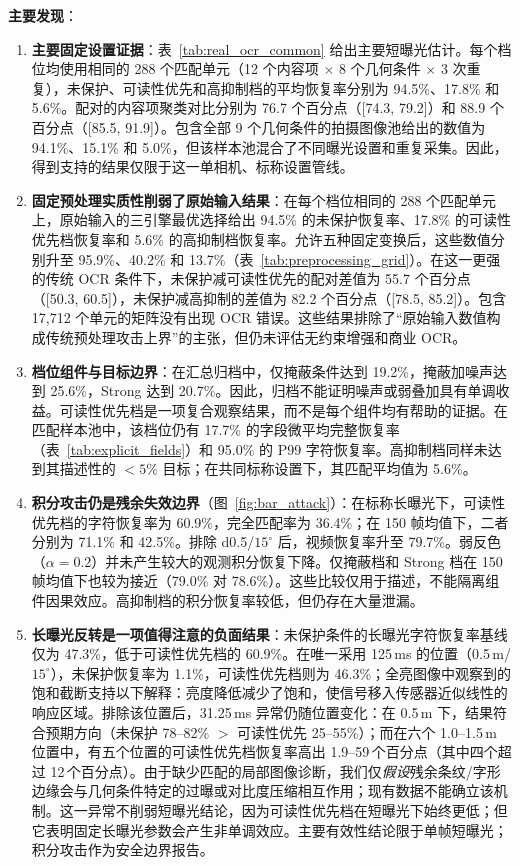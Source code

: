 \documentclass{ieeeaccess}
\begin{document}
\textbf{主要发现}：

\begin{enumerate}
\item \textbf{主要固定设置证据}：表~\ref{tab:real_ocr_common} 给出主要短曝光估计。每个档位均使用相同的 288 个匹配单元（12 个内容项 $\times$ 8 个几何条件 $\times$ 3 次重复），未保护、可读性优先和高抑制档的平均恢复率分别为 94.5\%、17.8\% 和 5.6\%。配对的内容项聚类对比分别为 76.7 个百分点（[74.3, 79.2]）和 88.9 个百分点（[85.5, 91.9]）。包含全部 9 个几何条件的拍摄图像池给出的数值为 94.1\%、15.1\% 和 5.0\%，但该样本池混合了不同曝光设置和重复采集。因此，得到支持的结果仅限于这一单相机、标称设置管线。

\item \textbf{固定预处理实质性削弱了原始输入结果}：在每个档位相同的 288 个匹配单元上，原始输入的三引擎最优选择给出 94.5\% 的未保护恢复率、17.8\% 的可读性优先档恢复率和 5.6\% 的高抑制档恢复率。允许五种固定变换后，这些数值分别升至 95.9\%、40.2\% 和 13.7\%（表~\ref{tab:preprocessing_grid}）。在这一更强的传统 OCR 条件下，未保护减可读性优先的配对差值为 55.7 个百分点（[50.3, 60.5]），未保护减高抑制的差值为 82.2 个百分点（[78.5, 85.2]）。包含 17,712 个单元的矩阵没有出现 OCR 错误。这些结果排除了“原始输入数值构成传统预处理攻击上界”的主张，但仍未评估无约束增强和商业 OCR。

\item \textbf{档位组件与目标边界}：在汇总归档中，仅掩蔽条件达到 19.2\%，掩蔽加噪声达到 25.6\%，Strong 达到 20.7\%。因此，归档不能证明噪声或弱叠加具有单调收益。可读性优先档是一项复合观察结果，而不是每个组件均有帮助的证据。在匹配样本池中，该档位仍有 17.7\% 的字段微平均完整恢复率（表~\ref{tab:explicit_fields}）和 95.0\% 的 P99 字符恢复率。高抑制档同样未达到其描述性的 $<5\%$ 目标；在共同标称设置下，其匹配平均值为 5.6\%。

\item \textbf{积分攻击仍是残余失效边界}（图~\ref{fig:bar_attack}）：在标称长曝光下，可读性优先档的字符恢复率为 60.9\%，完全匹配率为 36.4\%；在 150 帧均值下，二者分别为 71.1\% 和 42.5\%。排除 d0.5/$15^{\circ}$ 后，视频恢复率升至 79.7\%。弱反色（$\alpha=0.2$）并未产生较大的观测积分恢复下降。仅掩蔽档和 Strong 档在 150 帧均值下也较为接近（79.0\% 对 78.6\%）。这些比较仅用于描述，不能隔离组件因果效应。高抑制档的积分恢复率较低，但仍存在大量泄漏。

\item \textbf{长曝光反转是一项值得注意的负面结果}：未保护条件的长曝光字符恢复率基线仅为 47.3\%，低于可读性优先档的 60.9\%。在唯一采用 125\,ms 的位置（0.5\,m/$15^{\circ}$），未保护恢复率为 1.1\%，可读性优先档则为 46.3\%；全亮图像中观察到的饱和截断支持以下解释：亮度降低减少了饱和，使信号移入传感器近似线性的响应区域。排除该位置后，31.25\,ms 异常仍随位置变化：在 0.5\,m 下，结果符合预期方向（未保护 78--82\% $>$ 可读性优先 25--55\%）；而在六个 1.0--1.5\,m 位置中，有五个位置的可读性优先档恢复率高出 1.9--59\,个百分点（其中四个超过 12\,个百分点）。由于缺少匹配的局部图像诊断，我们仅\emph{假设}残余条纹/字形边缘会与几何条件特定的过曝或对比度压缩相互作用；现有数据不能确立该机制。这一异常不削弱短曝光结论，因为可读性优先档在短曝光下始终更低；但它表明固定长曝光参数会产生非单调效应。主要有效性结论限于单帧短曝光；积分攻击作为安全边界报告。


\end{enumerate}
\end{document}
